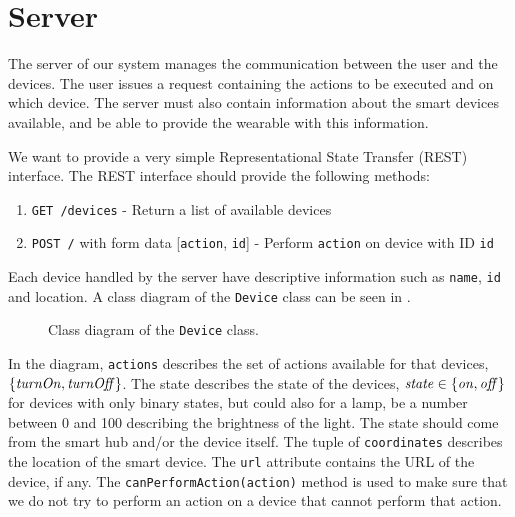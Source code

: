 \section{Server}\label{sec:serverdesign}
The server of our system manages the communication between the user and the devices. 
The user issues a request containing the actions to be executed and on which device. 
The server must also contain information about the smart devices available,
and be able to provide the wearable with this information. 

We want to provide a very simple Representational State Transfer (REST) interface.
The REST interface should provide the following methods:

\begin{enumerate}
  \item \texttt{GET /devices} - Return a list of available devices
  \item \texttt{POST /} with form data [\texttt{action}, \texttt{id}] - Perform \texttt{action} on device with ID \texttt{id}
\end{enumerate}

Each device handled by the server have descriptive information such as \texttt{name}, \texttt{id} and location. 
A class diagram of the \texttt{Device} class can be seen in .

\begin{figure}[!htb]
  \centering
  \label{fig:deviceclass}
  \caption{Class diagram of the \texttt{Device} class.}
\end{figure}

In the diagram, \texttt{actions} describes the set of actions available for that devices, \eg $\{\var{turnOn}, \var{turnOff}\}$. 
The state describes the state of the devices, 
\eg $\var{state} \in \{\var{on}, \var{off}\}$ for devices with only binary states, 
but could also for a lamp, be a number between \num{0} and \num{100} describing the brightness of the light. 
The state should come from the smart hub and/or the device itself. 
The tuple of \texttt{coordinates} describes the location of the smart device. 
The \texttt{url} attribute contains the URL of the device, if any. 
The \texttt{canPerformAction(action)} method is used to make sure that we do not try to perform an action on a device that cannot perform that action. 

